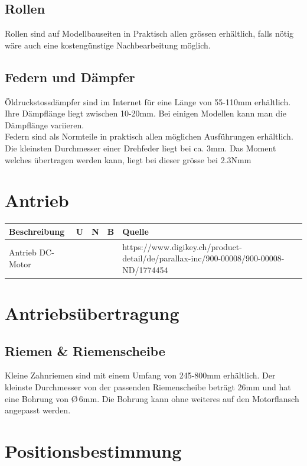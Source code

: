 \documentclass[a4paper]{report}
\begin{document}
	\subsection{Rollen}
		Rollen sind auf Modellbauseiten in Praktisch allen grössen erhältlich, falls nötig wäre auch eine kostengünstige Nachbearbeitung möglich.
	\subsection{Federn und Dämpfer}
		Öldruckstossdämpfer sind im Internet für eine Länge von 55-110mm erhältlich. Ihre Dämpflänge liegt zwischen 10-20mm. Bei einigen Modellen kann man die Dämpflänge variieren. \\
		Federn sind als Normteile in praktisch allen möglichen Ausführungen erhältlich. Die kleinsten Durchmesser einer Drehfeder liegt bei ca. 3mm. Das Moment welches übertragen werden kann, liegt bei dieser grösse bei 2.3Nmm

\section{Antrieb}
\begin{tabular}{|p{}|p{}|p{}|p{}|p{}|}
	\hline
	\textbf{Beschreibung} & \textbf{U} & \textbf{N} & \textbf{B} & \textbf{Quelle} \\
	\hline
	Antrieb DC-Motor & & & & https://www.digikey.ch/product-detail/de/parallax-inc/900-00008/900-00008-ND/1774454 \\
	\hline
\end{tabular}

\section{Antriebsübertragung}
	\subsection{Riemen \& Riemenscheibe}
		Kleine Zahnriemen sind mit einem Umfang von 245-800mm erhältlich. Der kleinste Durchmesser von der passenden Riemenscheibe beträgt 26mm und hat eine Bohrung von \O \,6mm. Die Bohrung kann ohne weiteres auf den Motorflansch angepasst werden.

\section{Positionsbestimmung}
\end{document}
